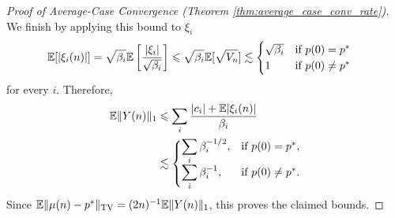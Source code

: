 \begin{proof}[Proof of Average-Case Convergence (Theorem \ref{thm:average_case_conv_rate})]
    We finish by applying this bound to $\xi_i$
    \begin{align*}
        \mathbb{E}[|\xi_i(n)|] &= \sqrt{\beta_i} \mathbb{E} \left[ \frac{|\xi_i|}{\sqrt{\beta_i}} \right] \leqslant \sqrt{\beta_i} \mathbb{E}[\sqrt{V_n}] \lesssim \begin{cases}
        \sqrt{\beta_i} & \text{if $p(0) = p^*$} \\
        1 & \text{if $p(0) \neq p^*$}
        \end{cases}
    \end{align*}
    for every $i$. Therefore,
    \begin{align*}
        \mathbb{E}\|Y(n)\|_1
        &\leqslant \sum_i \frac{|c_i|+\mathbb{E}|\xi_i(n)|}{\beta_i} \\
        &\lesssim
        \begin{cases}
            \displaystyle \sum_i \beta_i^{-1/2}, & \text{if $p(0)=p^*$},\\[6pt]
            \displaystyle \sum_i \beta_i^{-1}, & \text{if $p(0)\neq p^*$}.
        \end{cases}
    \end{align*}
    Since $\mathbb{E}\|\mu(n)-p^*\|_{\operatorname{TV}}=(2n)^{-1}\mathbb{E}\|Y(n)\|_1$, this proves the claimed bounds.
\end{proof}

